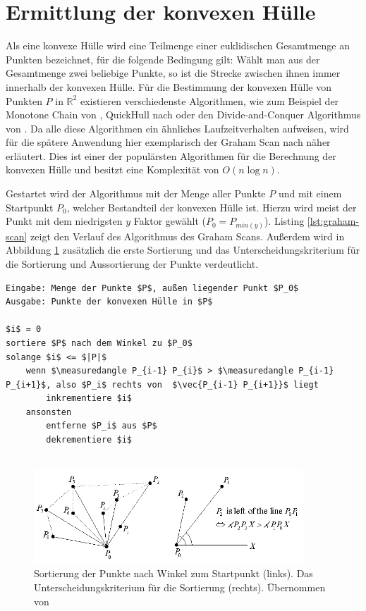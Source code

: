 \section{Ermittlung der konvexen Hülle}

Als eine konvexe Hülle wird eine Teilmenge einer euklidischen Gesamtmenge an Punkten bezeichnet, für die folgende Bedingung gilt: Wählt man aus der Gesamtmenge zwei beliebige Punkte, so ist die Strecke zwischen ihnen immer innerhalb der konvexen Hülle. Für die Bestimmung der konvexen Hülle von Punkten \(P\) in \( \mathbb{R}^2\) existieren verschiedenste Algorithmen, wie zum Beispiel der Monotone Chain von \citet{andrew1979another}, QuickHull nach \citet{eddy1977new} oder den Divide-and-Conquer Algorithmus von \citet{preparata1985convex}. Da alle diese Algorithmen ein ähnliches Laufzeitverhalten aufweisen, wird für die spätere Anwendung hier exemplarisch der Graham Scan nach \citet{graham1972efficient} näher erläutert. Dies ist einer der populärsten Algorithmen für die Berechnung der konvexen Hülle und besitzt eine Komplexität von \(O(n \log n)\).

Gestartet wird der Algorithmus mit der Menge aller Punkte \(P\) und mit einem Startpunkt \(P_0\), welcher Bestandteil der konvexen Hülle ist. Hierzu wird meist der Punkt mit dem niedrigsten \(y\) Faktor gewählt (\(P_0=P_{min(y)}\)). Listing \ref{lst:graham-scan} zeigt den Verlauf des Algorithmus des Graham Scans. Außerdem wird in Abbildung \ref{fig:convexhull} zusätzlich die erste Sortierung und das Unterscheidungskriterium für die Sortierung und Aussortierung der Punkte verdeutlicht. \citep{convexHull} 


\begin{lstlisting}[mathescape,caption=Graham Scan Algorithmus, label=lst:graham-scan, float=htbp]
Eingabe: Menge der Punkte $P$, außen liegender Punkt $P_0$
Ausgabe: Punkte der konvexen Hülle in $P$

$i$ = 0
sortiere $P$ nach dem Winkel zu $P_0$
solange $i$ <= $|P|$
    wenn $\measuredangle P_{i-1} P_{i}$ > $\measuredangle P_{i-1} P_{i+1}$, also $P_i$ rechts von  $\vec{P_{i-1} P_{i+1}}$ liegt
        inkrementiere $i$
    ansonsten
        entferne $P_i$ aus $P$
        dekrementiere $i$
    
\end{lstlisting} 

\begin{figure}[h]
  \centering
	\includegraphics[width=0.9\textwidth]{content/images/methods/convexhull.png} 
  \caption{Sortierung der Punkte nach Winkel zum Startpunkt (links). Das Unterscheidungskriterium für die Sortierung (rechts). Übernommen von \citet{convexHull}}
  \label{fig:convexhull}
\end{figure}
